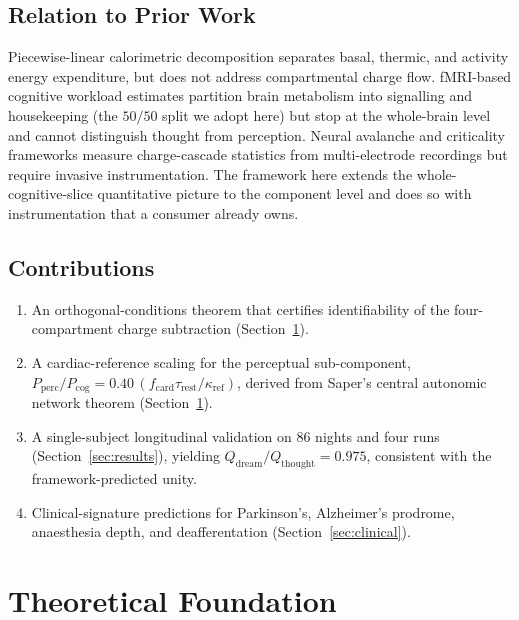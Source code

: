 \documentclass[11pt,twocolumn,a4paper]{article}
\theoremstyle{definition}
\theoremstyle{remark}
\newcommand{\Qth}{Q_{\mathrm{thought}}}
\newcommand{\Qdr}{Q_{\mathrm{dream}}}
\newcommand{\Pcog}{P_{\mathrm{cog}}}
\newcommand{\Pperc}{P_{\mathrm{perc}}}
\newcommand{\fcard}{f_{\mathrm{card}}}
\newcommand{\taurest}{\tau_{\mathrm{rest}}}
\begin{document}
\subsection{Relation to Prior Work}

Piecewise-linear calorimetric decomposition \citep{weir1949,levine2005}
separates basal, thermic, and activity energy expenditure, but does
not address compartmental charge flow. fMRI-based cognitive
workload estimates \citep{attwell2001,harris2012} partition
brain metabolism into signalling and housekeeping (the $50/50$
split we adopt here) but stop at the whole-brain level and cannot
distinguish thought from perception. Neural avalanche and criticality
frameworks \citep{beggs2003,petermann2009,chialvo2010} measure
charge-cascade statistics from multi-electrode recordings but require
invasive instrumentation. The framework here extends the
whole-cognitive-slice quantitative picture to the component level and
does so with instrumentation that a consumer already owns.

\subsection{Contributions}

\begin{enumerate}[leftmargin=1.3em]
  \item An orthogonal-conditions theorem that certifies identifiability
  of the four-compartment charge subtraction (Section~\ref{sec:theory}).
  \item A cardiac-reference scaling for the perceptual sub-component,
  $\Pperc/\Pcog = 0.40\,(\fcard\taurest/\kappa_{\mathrm{ref}})$,
  derived from Saper's central autonomic network theorem
  (Section~\ref{sec:theory}).
  \item A single-subject longitudinal validation on 86 nights and
  four runs (Section~\ref{sec:results}), yielding
  $\Qdr/\Qth = 0.975$, consistent with the framework-predicted unity.
  \item Clinical-signature predictions for Parkinson's, Alzheimer's
  prodrome, anaesthesia depth, and deafferentation
  (Section~\ref{sec:clinical}).
\end{enumerate}

\section{Theoretical Foundation}
\label{sec:theory}
\end{document}
